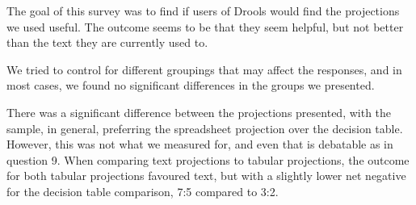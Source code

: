 The goal of this survey was to find if users of Drools would find the projections we used useful.
The outcome seems to be that they seem helpful, but not better than the text they are currently used to.

We tried to control for different groupings that may affect the responses, and in most cases, we found no significant differences in the groups we presented.

There was a significant difference between the projections presented, with the sample, in general, preferring the spreadsheet projection over the decision table. 
However, this was not what we measured for, and even that is debatable as in question 9.
When comparing text projections to tabular projections, the outcome for both tabular projections favoured text, but with a slightly lower net negative for the decision table comparison, 7:5 compared to 3:2.

